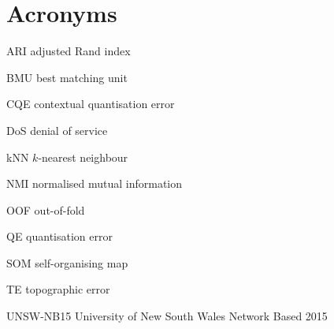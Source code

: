 \appendices
\section{Acronyms}
\begin{list}{}{\setlength{\labelwidth}{.25\columnwidth}\setlength{\leftmargin}{.29\columnwidth}\setlength{\itemsep}{0pt}\setlength{\parsep}{0pt}\renewcommand{\makelabel}[1]{#1\hfil}}
\item[ARI] adjusted Rand index
\item[BMU] best matching unit
\item[CQE] contextual quantisation error
\item[DoS] denial of service
\item[kNN] $k$-nearest neighbour
\item[NMI] normalised mutual information
\item[OOF] out-of-fold
\item[QE] quantisation error
\item[SOM] self-organising map
\item[TE] topographic error
\item[UNSW-NB15] University of New South Wales Network Based 2015
\end{list}


